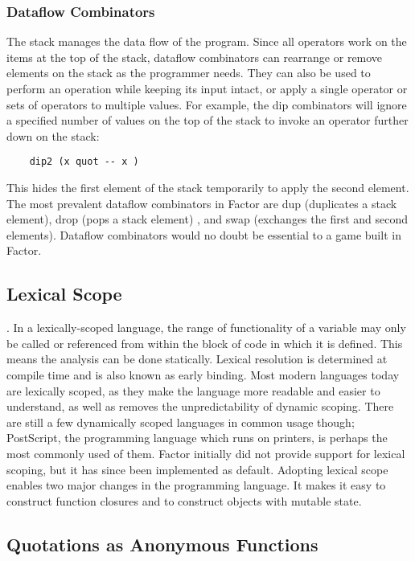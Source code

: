 \documentclass{sig-alternate}
\begin{document}
\subsubsection{Dataflow Combinators}
The stack manages the data flow of the program.\cite{FactorFAQ} Since all operators work on the items at the top of the stack, dataflow combinators can rearrange or remove elements on the stack as the programmer needs. They can also be used to perform an operation while keeping its input intact, or apply a single operator or sets of operators to multiple values.\cite{DataflowComibinators} For example, the dip combinators will ignore a specified number of values on the top of the stack to invoke an operator further down on the stack:

\begin{verbatim}
	dip2 (x quot -- x ) 
\end{verbatim}

This hides the first element of the stack temporarily to apply the second element. The most prevalent dataflow combinators in Factor are dup (duplicates a stack element), drop (pops a stack element) , and swap (exchanges the first and second elements).\cite{Combinators} Dataflow combinators would no doubt be essential to a game built in Factor.

\subsection{Lexical Scope}
.
In a lexically-scoped language, the range of functionality of a variable may only be called or referenced from within the block of code in which it is defined.  This means the analysis can be done statically. Lexical resolution is determined at compile time and is also known as early binding.  Most modern languages today are lexically scoped, as they make the language more readable and easier to  understand, as well as removes the unpredictability of dynamic scoping.   There are still a few dynamically scoped languages in common usage though; PostScript, the programming language which runs on printers, is  perhaps the most commonly used of them.\cite{LexicalScoping}  Factor initially did not provide support for lexical scoping, but it has since been implemented as default. Adopting lexical scope enables two major changes in the programming language.  It makes it easy to construct function closures and to construct objects with mutable state.\cite{LexicalScope}

\subsection{Quotations as Anonymous Functions}
\end{document}
